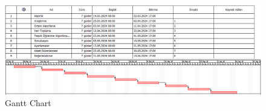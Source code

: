 \documentclass{article}
\begin{document}
\newpage

\begin{landscape}
\thispagestyle{empty}
    \begin{figure}
     \centering
  \includegraphics[width=1.8\textwidth]{mergedpng.png}\centering %
  \caption{Gantt Chart}
  \label{fig:resim_etiketi}
\end{figure}

\end{landscape}



\newpage




\end{document}
